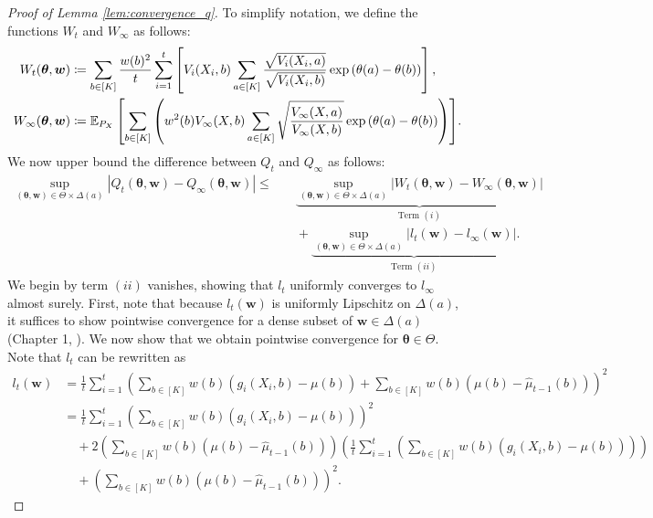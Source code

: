 \documentclass{article}
\begin{document}
\begin{appendices}
\begin{proof}[Proof of Lemma \ref{lem:convergence_q}]
To simplify notation, we define the functions $W_t$ and $W_\infty$ as follows:
\begin{align}
    W_t(\boldsymbol{\theta}, \boldsymbol{w}) &\coloneqq \sum_{b \in [K]} \frac{w(b)^2}{t} \sum_{i=1}^t\left[V_i(X_i,b)\sum_{a \in [K]}\frac{ \sqrt{V_i(X_i,a) } }{\sqrt{V_i(X_i,b) } }\exp\left(\theta(a) - \theta(b)\right)\right], \\
    W_\infty(\boldsymbol\theta, \boldsymbol{w}) &\coloneqq {\mathbb{E}_{P_X}\left[ \sum_{b \in [K]} \left(w^2(b) V_\infty(X,b) \sum_{a \in [K]}\sqrt{\frac{V_\infty(X,a)}{V_\infty(X,b)}}\exp\left(\theta(a) - \theta(b)\right)\right) \right]}.
\end{align}
We now upper bound the difference between $Q_t$ and $Q_\infty$ as follows:
\begin{align}
    \sup_{(\bm{\theta}, \bm{w}) \in \Theta \times \Delta(a)}| Q_t(\bm{\theta}, \bm{w}) - Q_\infty(\bm{\theta}, \bm{w})| \leq & \quad \underbrace{\sup_{(\bm{\theta}, \bm{w}) \in \Theta \times \Delta(a)} \left|W_{t}(\bm\theta, \bm{w}) - W_\infty(\bm\theta, \bm{w}) \right|}_{\text{Term $(i)$}}  \\
    &\quad + \underbrace{\sup_{(\bm{\theta}, \bm{w}) \in \Theta \times \Delta(a)} \left|l_t(\bm{w}) - l_\infty(\bm{w}) \right|}_{\text{Term $(ii)$}}.
\end{align}
We begin by term $(ii)$ vanishes, showing that $l_t$ uniformly converges to $l_\infty$ almost surely. First, note that because $l_t(\bm{w})$ is uniformly Lipschitz on $\Delta(a)$, it suffices to show pointwise convergence for a dense subset of $\bm{w} \in \Delta(a)$ (Chapter 1, \cite{vandervaart1996weak}). We now show that we obtain pointwise convergence for $\bm\theta \in \Theta$. Note that $l_t$ can be rewritten as 
\begin{align}
    l_t(\bm{w}) &= \frac{1}{t}\sum_{i=1}^t \left(\sum_{b \in [K]} w(b)\left( g_i(X_i,b) - \mu(b)\right)+\sum_{b \in [K]}w(b)(\mu(b) - \hat\mu_{t-1}(b))\right)^2\\
    &= \frac{1}{t}\sum_{i=1}^t \left(\sum_{b \in [K]} w(b) (g_i(X_i,b) - \mu(b)) \right)^2\\
    &\quad + 2\left(\sum_{b \in [K]}w(b) (\mu(b) - \hat\mu_{t-1}(b)) \right)\left(\frac{1}{t}\sum_{i=1}^t \left(\sum_{b \in [K]} w(b) (g_i(X_i,b) - \mu(b)) \right)\right)  \label{eq:term_1} \\ 
    &\quad +  \left(\sum_{b \in [K]} w(b)(\mu(b) - \hat\mu_{t-1}(b)) \right)^2. \label{eq:term_2}
\end{align}

\end{proof}
\end{appendices}
\end{document}
